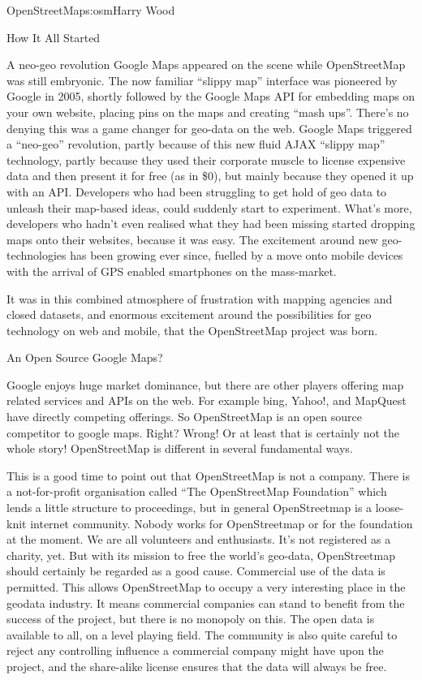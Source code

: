 \begin{aosachapter}{OpenStreetMap}{s:osm}{Harry Wood}
\begin{aosasect1}{How It All Started}
\begin{aosasect2}{A neo-geo revolution}
Google Maps appeared on the scene while OpenStreetMap was still
embryonic. The now familiar ``slippy map'' interface was pioneered by
Google in 2005, shortly followed by the Google Maps API for embedding
maps on your own website, placing pins on the maps and creating ``mash
ups''. There's no denying this was a game changer for geo-data on the
web. Google Maps triggered a ``neo-geo'' revolution, partly because of
this new fluid AJAX ``slippy map'' technology, partly because they
used their corporate muscle to license expensive data and then present
it for free (as in \$0), but mainly because they opened it up with an
API. Developers who had been struggling to get hold of geo data to
unleash their map-based ideas, could suddenly start to
experiment. What's more, developers who hadn't even realised what they
had been missing started dropping maps onto their websites, because it
was easy. The excitement around new geo-technologies has been growing
ever since, fuelled by a move onto mobile devices with the arrival of
GPS enabled smartphones on the mass-market.

It was in this combined atmosphere of frustration with mapping
agencies and closed datasets, and enormous excitement around the
possibilities for geo technology on web and mobile, that the
OpenStreetMap project was born.

\end{aosasect2}

\end{aosasect1}

\begin{aosasect1}{An Open Source Google Maps?}

Google enjoys huge market dominance, but there are other players
offering map related services and APIs on the web. For example bing,
Yahoo!, and MapQuest have directly competing offerings. So
OpenStreetMap is an open source competitor to google maps. Right?
Wrong! Or at least that is certainly not the whole story!
OpenStreetMap is different in several fundamental ways.

This is a good time to point out that OpenStreetMap is not a
company. There is a not-for-profit organisation called ``The
OpenStreetMap Foundation'' which lends a little structure to
proceedings, but in general OpenStreetmap is a loose-knit internet
community. Nobody works for OpenStreetmap or for the foundation at the
moment. We are all volunteers and enthusiasts. It's not registered as
a charity, yet. But with its mission to free the world's geo-data,
OpenStreetmap should certainly be regarded as a good cause. Commercial
use of the data is permitted. This allows OpenStreetMap to occupy a
very interesting place in the geodata industry. It means commercial
companies can stand to benefit from the success of the project, but
there is no monopoly on this. The open data is available to all, on a
level playing field. The community is also quite careful to reject any
controlling influence a commercial company might have upon the
project, and the share-alike license ensures that the data will always
be free.


\end{aosasect1}
\end{aosachapter}

